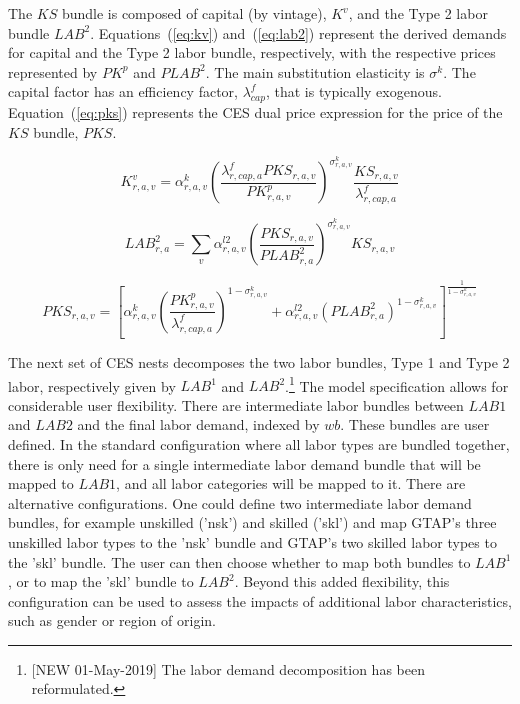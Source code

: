 \documentclass[11pt,letterpaper]{report}
\begin{document}
The $\mathit{KS}$ bundle is composed of capital (by vintage), $\mathit{K}^v$,
and the Type 2 labor bundle $\mathit{LAB}^2$. Equations~(\ref{eq:kv})
and~(\ref{eq:lab2}) represent the derived demands for capital and the Type 2
labor bundle, respectively, with the respective prices represented by
$\mathit{PK}^p$ and $\mathit{PLAB}^2$. The main substitution elasticity is
$\sigma^{\mathit{k}}$. The capital factor has an efficiency factor,
$\lambda^{\mathit{f}}_{\mathit{cap}}$, that is typically exogenous.
Equation~(\ref{eq:pks}) represents the CES dual price expression for
the price of the $\mathit{KS}$ bundle, $\mathit{PKS}$.

\begin{equation}
\label{eq:kv}
\mathit{K}^v_{r,a,v} =
   \alpha^{\mathit{k}}_{\mathit{r,a,v}}
   \left( \frac {\lambda^{\mathit{f}}_{r,\mathit{cap},a} \mathit{PKS}_{r,a,v}}
      {\mathit{PK}^p_{r,a,v}}
   \right)^{\sigma^{\mathit{k}}_{\mathit{r,a,v}}}
   \frac {\mathit{KS}_{r,a,v}} {\lambda^{\mathit{f}}_{r,\mathit{cap},a}}
\end{equation}

\begin{equation}
\label{eq:lab2}
\mathit{LAB}^2_{r,a} =
   \sum_v{
      \alpha^{\mathit{l2}}_{\mathit{r,a,v}}
      \left( \frac {\mathit{PKS}_{r,a,v}} {\mathit{PLAB}^2_{r,a}}
      \right)^{\sigma^{\mathit{k}}_{\mathit{r,a,v}}}
      \mathit{KS}_{r,a,v}
   }
\end{equation}

\begin{equation}
\label{eq:pks}
\mathit{PKS}_{r,a,v} =
   \left[
      \alpha^{\mathit{k}}_{\mathit{r,a,v}}
      \left( \frac {\mathit{PK}^p_{r,a,v}}
         {\lambda^{\mathit{f}}_{r,\mathit{cap},a}}
      \right)^{1 - \sigma^{\mathit{k}}_{\mathit{r,a,v}}}
   +  \alpha^{\mathit{l2}}_{\mathit{r,a,v}}
      \left( \mathit{PLAB}^2_{r,a}
      \right)^{1 - \sigma^{\mathit{k}}_{\mathit{r,a,v}}}
   \right]^{\frac{1} {1 - \sigma^{\mathit{k}}_{\mathit{r,a,v}}}}
\end{equation}

The next set of CES nests decomposes the two labor bundles, Type 1 and
Type 2 labor, respectively given by $\mathit{LAB^1}$ and
$\mathit{LAB^2}$.\footnote{[NEW 01-May-2019] The labor demand
decomposition has been reformulated.}
The model specification allows for considerable user
flexibility. There are intermediate labor bundles between $\mathit{LAB1}$
and $\mathit{LAB2}$ and the final labor demand, indexed by $\mathit{wb}$.
These bundles are user
defined. In the standard configuration where all labor types are bundled
together, there is only need for a single intermediate labor demand bundle
that will be mapped to $\mathit{LAB1}$, and all labor categories will be mapped to it.
There are alternative configurations. One could define two intermediate labor
demand bundles, for example unskilled ('nsk') and skilled ('skl') and map
GTAP's three unskilled labor types to the 'nsk' bundle and GTAP's two
skilled labor types to the 'skl' bundle. The user can then choose whether
to map both bundles to $\mathit{LAB^1}$, or to map the 'skl' bundle to $\mathit{LAB^2}$.
Beyond this added flexibility, this configuration can be used to assess the
impacts of additional labor characteristics, such as gender or region of origin.
\end{document}
